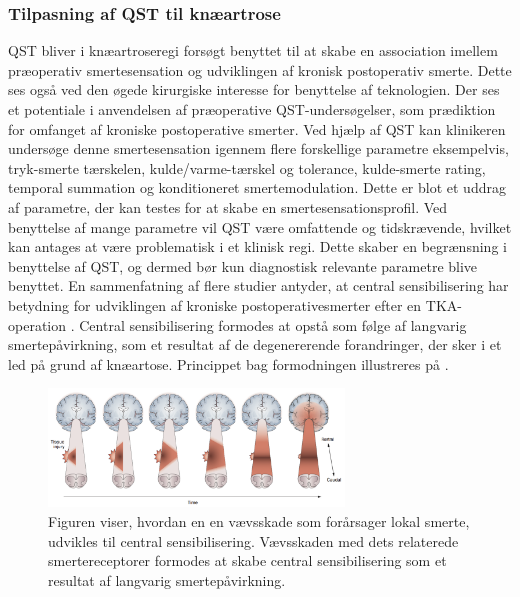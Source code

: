 \subsubsection{Tilpasning af QST til knæartrose}
QST bliver i  knæartroseregi forsøgt benyttet til at skabe en association imellem præoperativ smertesensation og udviklingen af kronisk postoperativ smerte. Dette ses også ved den øgede kirurgiske interesse for benyttelse af teknologien. Der ses et potentiale i anvendelsen af præoperative QST-undersøgelser, som prædiktion for omfanget af kroniske postoperative smerter. \citep{Wylde2013} Ved hjælp af QST kan klinikeren undersøge denne smertesensation igennem flere forskellige parametre eksempelvis, tryk-smerte tærskelen, kulde/varme-tærskel og tolerance, kulde-smerte rating, temporal summation og konditioneret smertemodulation. \citep{Cornelius2015} Dette er blot et uddrag af parametre, der kan testes for at skabe en smertesensationsprofil. Ved benyttelse af mange parametre vil QST være omfattende og tidskrævende, hvilket kan antages at være problematisk i et klinisk regi. Dette skaber en begrænsning i benyttelse af QST, og dermed bør kun diagnostisk relevante parametre blive benyttet. \citep{Nielsen2009} En sammenfatning af flere studier antyder, at central sensibilisering har betydning for udviklingen af kroniske postoperativesmerter efter en TKA-operation \citep{Suokas2012}. Central sensibilisering formodes at opstå som følge af langvarig smertepåvirkning, som et resultat af de degenererende forandringer, der sker i et led på grund af knæartose. \citep{Arendt-Nielsen2015b} Princippet bag formodningen illustreres på  \citep{Graven-Nielsen2010} . 

\begin{figure}[H] 
	\begin{center}
		\includegraphics[width=0.7\textwidth]{figures/dHTAanalyse/widespread_sens}
	\end{center}
	\caption{Figuren viser, hvordan en en vævsskade som forårsager lokal smerte, udvikles til central sensibilisering. Vævsskaden med dets relaterede smertereceptorer formodes at skabe central sensibilisering som et resultat af langvarig smertepåvirkning. \citep{Graven-Nielsen2010}} 
	\label{fig:widespread_sens} 
\end{figure} \vspace{-.25cm}

